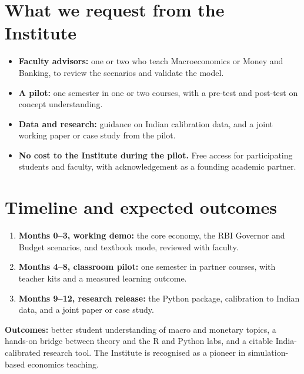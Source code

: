 \documentclass[10pt,a4paper]{article}
\begin{document}
\noindent\begin{minipage}[t]{0.485\linewidth}
\section{What we request from the Institute}
\begin{itemize}
  \item \textbf{Faculty advisors:} one or two who teach Macroeconomics or Money and Banking, to review the scenarios and validate the model.
  \item \textbf{A pilot:} one semester in one or two courses, with a pre-test and post-test on concept understanding.
  \item \textbf{Data and research:} guidance on Indian calibration data, and a joint working paper or case study from the pilot.
  \item \textbf{No cost to the Institute during the pilot.} Free access for participating students and faculty, with acknowledgement as a founding academic partner.
\end{itemize}
\end{minipage}\hfill
\begin{minipage}[t]{0.485\linewidth}
\section{Timeline and expected outcomes}
\begin{enumerate}
  \item \textbf{Months 0--3, working demo:} the core economy, the RBI Governor and Budget scenarios, and textbook mode, reviewed with faculty.
  \item \textbf{Months 4--8, classroom pilot:} one semester in partner courses, with teacher kits and a measured learning outcome.
  \item \textbf{Months 9--12, research release:} the Python package, calibration to Indian data, and a joint paper or case study.
\end{enumerate}
\vspace{2pt}
\textbf{Outcomes:} better student understanding of macro and monetary topics, a hands-on bridge between theory and the R and Python labs, and a citable India-calibrated research tool. The Institute is recognised as a pioneer in simulation-based economics teaching.
\end{minipage}
\end{document}
